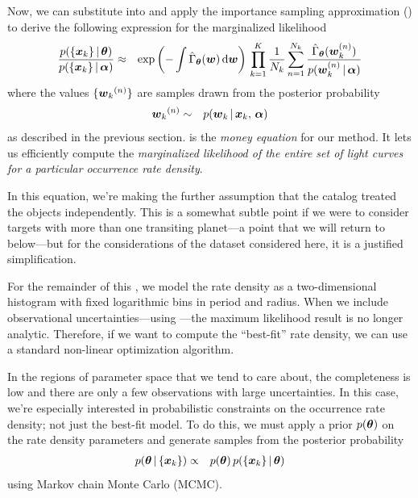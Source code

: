 Now, we can substitute  into  and apply
the importance sampling approximation () to derive the
following expression for the marginalized likelihood
\begin{eqnarray}\eqlabel{money}
\frac{p(\{\data_k\}\,|\,\ratepars)}{p(\{\data_k\}\,|\,\interim)} &\approx&
    \exp\left(-\int \obs{\rate}_\ratepars (\entry) \dd\entry\right) \,
    \prod_{k=1}^K
    \frac{1}{N_k} \sum_{n=1}^{N_k}
    \frac{\obs{\rate}_\ratepars (\entry_k^{(n)})}
         {p(\entry_k^{(n)}\,|\,\interim)}
\end{eqnarray}
where the values $\{{{{\boldsymbol{w}}}_k}^{(n)}\}$ are samples drawn from the posterior
probability
\begin{eqnarray}
{{\ensuremath{{\boldsymbol{w}}}}_k}^{(n)} &\sim& p({{\boldsymbol{w}}}_k\,|\,{{\boldsymbol{x}}}_k,\,{{\boldsymbol{\alpha}}})
\end{eqnarray}
as described in the previous section.
 is the \emph{money equation} for our method.
It lets us efficiently compute the \emph{marginalized likelihood of the entire
set of light curves for a particular occurrence rate density}.

In this equation, we're making the further assumption that the catalog treated
the objects independently.
This is a somewhat subtle point if we were to consider targets with more than
one transiting planet---a point that we will return to below---but for the
considerations of the dataset considered here, it is a justified
simplification.

For the remainder of this \paper, we model the rate density as a
two-dimensional histogram with fixed logarithmic bins in period and radius.
When we include observational uncertainties---using ---the maximum
likelihood result is no longer analytic.
Therefore, if we want to compute the ``best-fit'' rate density, we can use a
standard non-linear optimization algorithm.

In the regions of parameter space that we tend to care about, the completeness
is low and there are only a few observations with large uncertainties.
In this case, we're especially interested in probabilistic constraints on the
occurrence rate density; not just the best-fit model.
To do this, we must apply a prior $p({{\boldsymbol{{\theta}}}})$ on the rate density
parameters and generate samples from the posterior probability
\begin{eqnarray}\eqlabel{posterior}
p(\ratepars\,|\,\{\data_k\}) &\propto&
    p(\ratepars)\,p(\{\data_k\}\,|\,\ratepars)
\end{eqnarray}
using Markov chain Monte Carlo (MCMC).

